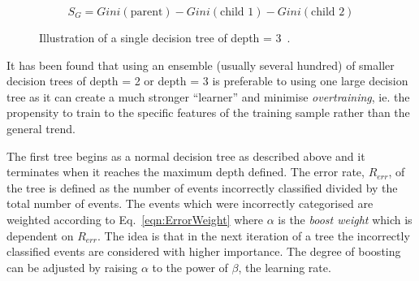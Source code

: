 

\begin{equation}
S_{G} = Gini(\textrm{parent}) - Gini(\textrm{child 1}) - Gini(\textrm{child 2})
\label{eqn:SepGain}
\end{equation}

\begin{figure}[h!]
\begin{center}
\hspace{0.2cm}
\end{center}
\caption{Illustration of a single decision tree of depth = 3~\cite{2007physics3039H}.}
\label{fig:DecisionTree}
\end{figure} 

It has been found that using an ensemble (usually several hundred) of smaller decision trees of depth = 2 or depth = 3 is preferable to using one large decision tree as it can create a much stronger ``learner'' and minimise \emph{overtraining}, ie. the propensity to train to the specific features of the training sample rather than the general trend. 

The first tree begins as a normal decision tree as described above and it terminates when it reaches the maximum depth defined. The error rate, $R_{err}$, of the tree is defined as the number of events incorrectly classified divided by the total number of events. The events which were incorrectly categorised are weighted according to Eq.~\ref{eqn:ErrorWeight} where $\alpha$ is the \emph{boost weight} which is dependent on $R_{err}$. The idea is that in the next iteration of a tree the incorrectly classified events are considered with higher importance. The degree of boosting can be adjusted by raising $\alpha$ to the power of $\beta$, the learning rate.

